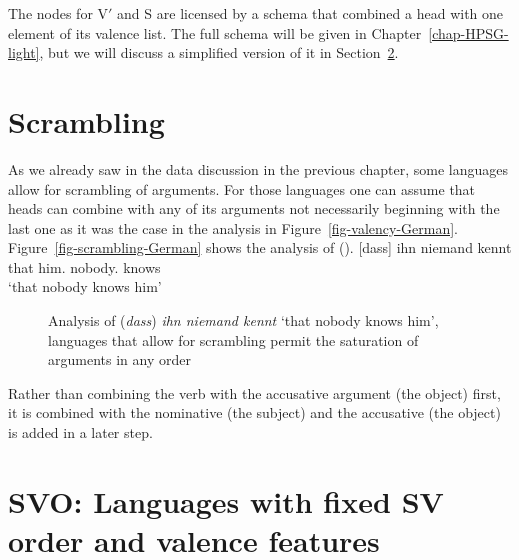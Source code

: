 The nodes for V$'$ and S are licensed by a schema that combined a head with one element of its
valence list. The full schema will be given in Chapter~\ref{chap-HPSG-light}, but we will discuss a
simplified version of it in Section~\ref{sec-intro-schemata}.


\section{Scrambling}
\label{sec-scrambling}

As we already saw in the data discussion in the previous chapter, some languages allow for
scrambling of arguments. For those languages one can assume that heads can combine with any of its
arguments not necessarily beginning with the last one as it was the case in the analysis in Figure~\ref{fig-valency-German}.
Figure~\vref{fig-scrambling-German} shows the analysis of ().
\ea
\gll {}[dass] ihn niemand kennt\\
     \spacebr{}that him.\acc{} nobody.\nom{} knows\\
\glt `that nobody knows him'
\z
\begin{figure}
\caption{\label{fig-scrambling-German}Analysis of (\emph{dass}) \emph{ihn niemand kennt} `that nobody
  knows him', languages that allow for scrambling permit the saturation of arguments in any order}
\end{figure}
Rather than combining the verb with the accusative argument (the object) first, it is combined with
the nominative (the subject) and the accusative (the object) is added in a later step.


\section{SVO: Languages with fixed SV order and valence features}
\label{sec-intro-schemata}
\label{sec-intro-spr-comps}

